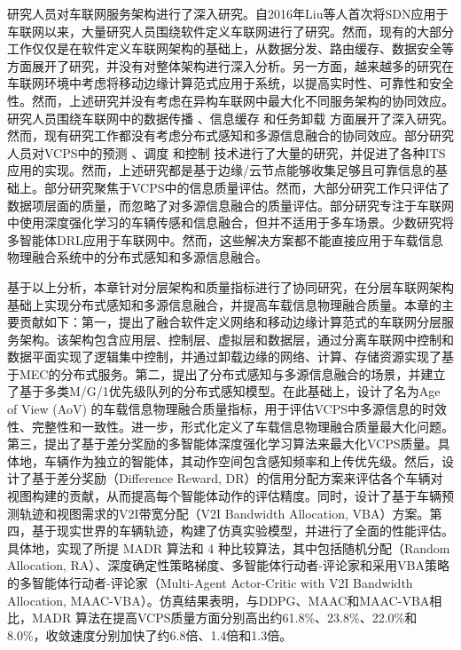 研究人员对车联网服务架构进行了深入研究。自2016年Liu等人\cite{liu2016cooperative}首次将SDN应用于车联网以来，大量研究人员围绕软件定义车联网进行了研究\cite{dai2018cooperative, luo2018sdnmac, liu2018coding, zhang2022ac-sdvn, zhao2022elite, lin2023alps, ahmed2023deep}。然而，现有的大部分工作仅仅是在软件定义车联网架构的基础上，从数据分发、路由缓存、数据安全等方面展开了研究，并没有对整体架构进行深入分析。另一方面，越来越多的研究在车联网环境中考虑将移动边缘计算范式应用于系统，以提高实时性、可靠性和安全性\cite{liu2017a, lang2022cooperative, liu2021fog, dai2021edge, zhang2022digital, liu2020adaptive, liao2021learning, liu2023mobility, liu2023asynchronous}。然而，上述研究并没有考虑在异构车联网中最大化不同服务架构的协同效应。研究人员围绕车联网中的数据传播 \cite{liu2021fog, singh2020intent}、信息缓存 \cite{zhang2022digital, dai2020deep, su2018an} 和任务卸载 \cite{shang2021deep, liao2021learning} 方面展开了深入研究。然而，现有研究工作都没有考虑分布式感知和多源信息融合的协同效应。部分研究人员对VCPS中的预测 \cite{zhang2019a, zhang2020data}、调度 \cite{li2020cyber, lian2021cyber} 和控制 \cite{dai2016a, hu2017cyber, lv2018driving}技术进行了大量的研究，并促进了各种ITS应用的实现。然而，上述研究都是基于边缘/云节点能够收集足够且可靠信息的基础上。部分研究聚焦于VCPS中的信息质量评估\cite{liu2014temporal, dai2019temporal, liu2014scheduling, rager2017scalability, yoon2021performance}。然而，大部分研究工作只评估了数据项层面的质量，而忽略了对多源信息融合的质量评估。部分研究专注于车联网中使用深度强化学习的车辆传感和信息融合\cite{dong2020spatio, zhao2020social, mlika2022deep}，但并不适用于多车场景。少数研究将多智能体DRL应用于车联网中\cite{kumar2022multi, he2021efficient}。然而，这些解决方案都不能直接应用于车载信息物理融合系统中的分布式感知和多源信息融合。

基于以上分析，本章针对分层架构和质量指标进行了协同研究，在分层车联网架构基础上实现分布式感知和多源信息融合，并提高车载信息物理融合质量。本章的主要贡献如下：第一，提出了融合软件定义网络和移动边缘计算范式的车联网分层服务架构。该架构包含应用层、控制层、虚拟层和数据层，通过分离车联网中控制和数据平面实现了逻辑集中控制，并通过卸载边缘的网络、计算、存储资源实现了基于MEC的分布式服务。第二，提出了分布式感知与多源信息融合的场景，并建立了基于多类M/G/1优先级队列的分布式感知模型。在此基础上，设计了名为Age of View (AoV) 的车载信息物理融合质量指标，用于评估VCPS中多源信息的时效性、完整性和一致性。进一步，形式化定义了车载信息物理融合质量最大化问题。第三，提出了基于差分奖励的多智能体深度强化学习算法来最大化VCPS质量。具体地，车辆作为独立的智能体，其动作空间包含感知频率和上传优先级。然后，设计了基于差分奖励（Difference Reward, DR）的信用分配方案来评估各个车辆对视图构建的贡献，从而提高每个智能体动作的评估精度。同时，设计了基于车辆预测轨迹和视图需求的V2I带宽分配（V2I Bandwidth Allocation, VBA）方案。第四，基于现实世界的车辆轨迹，构建了仿真实验模型，并进行了全面的性能评估。具体地，实现了所提 MADR 算法和 4 种比较算法，其中包括随机分配（Random Allocation, RA）、深度确定性策略梯度\cite{mlika2022deep}、多智能体行动者-评论家\cite{he2021efficient}和采用VBA策略的多智能体行动者-评论家（Multi-Agent Actor-Critic with V2I Bandwidth Allocation, MAAC-VBA）。仿真结果表明，与DDPG、MAAC和MAAC-VBA相比，MADR 算法在提高VCPS质量方面分别高出约61.8\%、23.8\%、22.0\%和8.0\%，收敛速度分别加快了约6.8倍、1.4倍和1.3倍。

